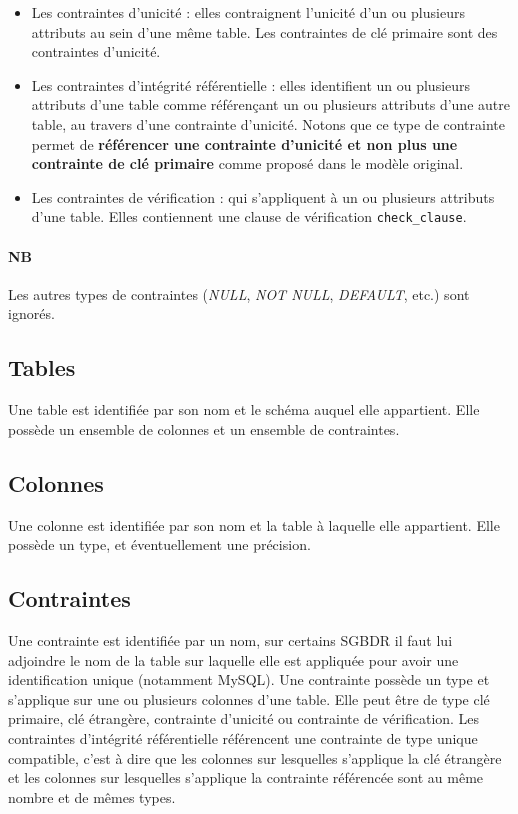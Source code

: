 \begin{itemize}
\item Les contraintes d'unicité : elles contraignent l'unicité d'un ou plusieurs attributs au sein d'une même table. Les contraintes de clé primaire sont des contraintes d'unicité.
\item Les contraintes d'intégrité référentielle : elles identifient un ou plusieurs attributs d'une table comme référençant un ou plusieurs attributs d'une autre table, au travers d'une contrainte d'unicité. Notons que ce type de contrainte permet de \textbf{référencer une contrainte d'unicité et non plus une contrainte de clé primaire} comme proposé dans le modèle original.
\item Les contraintes de vérification : qui s'appliquent à un ou plusieurs attributs d'une table. Elles contiennent une clause de vérification \texttt{check\_clause}.
\end{itemize}

\paragraph*{NB}
Les autres types de contraintes (\emph{NULL}, \emph{NOT NULL}, \emph{DEFAULT}, etc.) sont ignorés.

	\subsection{Tables}
		Une table est identifiée par son nom et le schéma auquel elle appartient. Elle possède un ensemble de colonnes et un ensemble de contraintes.
	\subsection{Colonnes}
		Une colonne est identifiée par son nom et la table à laquelle elle appartient. Elle possède un type, et éventuellement une précision. 
	\subsection{Contraintes}
		Une contrainte est identifiée par un nom, sur certains SGBDR il faut lui adjoindre le nom de la table sur laquelle elle est appliquée pour avoir une identification unique (notamment MySQL). Une contrainte possède un type et s'applique sur une ou plusieurs colonnes d'une table. Elle peut être de type clé primaire, clé étrangère, contrainte d'unicité ou contrainte de vérification. Les contraintes d'intégrité référentielle référencent une contrainte de type unique compatible, c'est à dire que les colonnes sur lesquelles s'applique la clé étrangère et les colonnes sur lesquelles s'applique la contrainte référencée sont au même nombre et de mêmes types.
		
